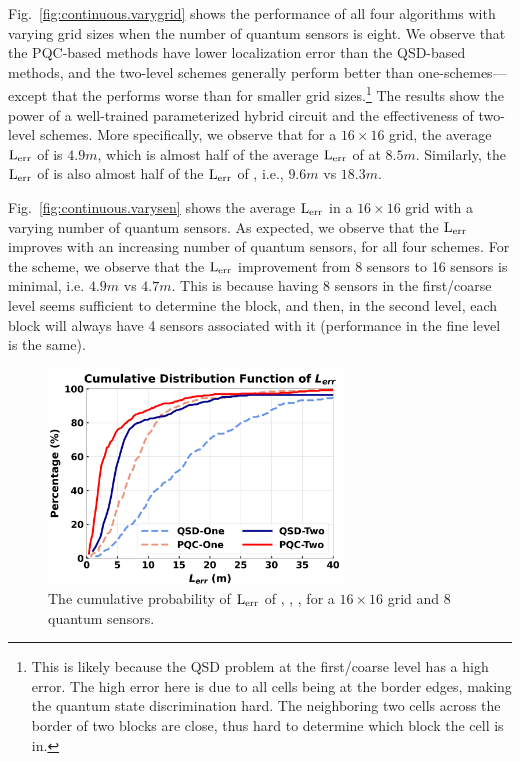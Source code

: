  Fig.~\ref{fig:continuous.varygrid} shows the performance of all four algorithms with varying grid sizes when the number of quantum sensors is eight. 
We observe that the PQC-based methods have lower localization error than the QSD-based methods, and
the two-level schemes generally perform better than one-schemes---except that the \povm performs worse than \povmone for smaller grid sizes.\footnote{This is likely because the QSD problem at the first/coarse level has a high error. 
The high error here is due to all cells being at the border edges, making the quantum state discrimination hard.
The neighboring two cells across the border of two blocks are close, thus hard to determine which block the cell is in.}
The results show the power of a well-trained parameterized hybrid circuit and the effectiveness of two-level schemes. 
More specifically, we observe that for a $16\times16$ grid, the average $\mathrm{L_{err}}$ of \pqctwo is $4.9 m$, which is almost half of the average $\mathrm{L_{err}}$ of \pqcone at $8.5m$.
Similarly, the $\mathrm{L_{err}}$ of \povm is also almost half of the $\mathrm{L_{err}}$ of \povmone, i.e., $9.6m$ vs $18.3m$.



Fig.~\ref{fig:continuous.varysen} shows the average $\mathrm{L_{err}}$ in a $16\times16$ grid with a varying number of quantum sensors.
As expected, we observe that the $\mathrm{L_{err}}$ improves with an increasing number of quantum sensors,
for all four schemes.
For the \pqctwo scheme, we observe that the $\mathrm{L_{err}}$ improvement from 8 sensors to 16 sensors is minimal, i.e. $4.9 m$ vs $4.7 m$. 
This is because having 8 sensors in the first/coarse level seems sufficient to determine the block,
and then, in the second level, each block will always have 4 sensors associated with it (performance in the fine level is the same). 

\begin{figure}[t]
    \centering
    \includegraphics[width=0.7\textwidth]{chapters/qce/figures/error_cdf.png}
    \caption{The cumulative probability of $\mathrm{L_{err}}$ of \povmone, \povm, \pqcone, \pqctwo for a $16\times16$ grid and 8 quantum sensors.}
    \label{fig:continuous.errorcdf}
\end{figure}

